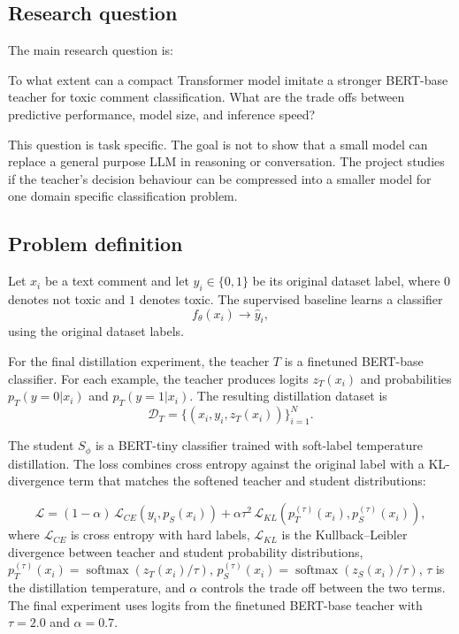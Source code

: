 \documentclass[pdflatex,sn-mathphys-num]{sn-jnl}
\begin{document}
\subsection{Research question}

The main research question is:


To what extent can a compact Transformer model imitate a stronger BERT-base teacher for toxic comment classification.
What are the trade offs between predictive performance, model size, and inference speed?


This question is task specific. 
The goal is not to show that a small model can replace a general purpose LLM in reasoning or conversation. 
The project studies if the teacher's decision behaviour can be compressed into a smaller model for one domain specific classification problem.

\subsection{Problem definition}

Let $x_i$ be a text comment and let $y_i \in \{0,1\}$ be its original dataset label, where $0$ denotes not toxic and $1$ denotes toxic. 
The supervised baseline learns a classifier
\begin{equation}
    f_{\theta}(x_i) \rightarrow \hat{y}_i,
\end{equation}
using the original dataset labels. 


For the final distillation experiment, the teacher $T$ is a finetuned BERT-base classifier.
For each example, the teacher produces logits $z_T(x_i)$ and probabilities $p_T(y=0|x_i)$ and $p_T(y=1|x_i)$.
The resulting distillation dataset is
\begin{equation}
    \mathcal{D}_T = \{(x_i, y_i, z_T(x_i))\}_{i=1}^{N}.
\end{equation}

The student $S_{\phi}$ is a BERT-tiny classifier trained with soft-label temperature distillation.
The loss combines cross entropy against the original label with a KL-divergence term that matches the softened teacher and student distributions:

\begin{equation}
    \mathcal{L} = (1 - \alpha)\,\mathcal{L}_{CE}(y_i, p_S(x_i)) + \alpha \tau^2\,\mathcal{L}_{KL}(p_T^{(\tau)}(x_i), p_S^{(\tau)}(x_i)),
\end{equation}
where $\mathcal{L}_{CE}$ is cross entropy with hard labels, $\mathcal{L}_{KL}$ is the Kullback--Leibler divergence between teacher and student probability distributions, $p_T^{(\tau)}(x_i)=\operatorname{softmax}(z_T(x_i)/\tau)$, $p_S^{(\tau)}(x_i)=\operatorname{softmax}(z_S(x_i)/\tau)$, $\tau$ is the distillation temperature, and $\alpha$ controls the trade off between the two terms.
The final experiment uses logits from the finetuned BERT-base teacher with $\tau=2.0$ and $\alpha=0.7$.
\end{document}
